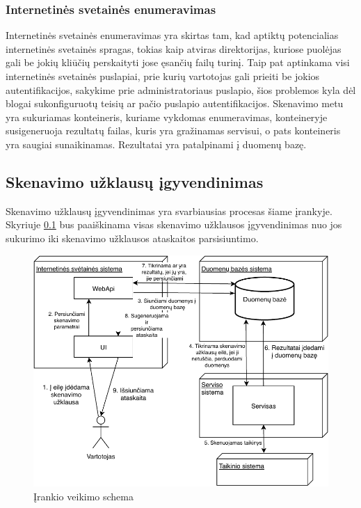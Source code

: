 \documentclass[a4paper,12pt,fleqn]{article}
\begin{document}
\subsubsection{Internetinės svetainės enumeravimas}
\label{sec:scanEnum}
Internetinės svetainės enumeravimas yra skirtas tam, kad aptiktų potencialias internetinės svetainės spragas, tokias kaip atviras direktorijas, kuriose puolėjas gali be jokių kliūčių perskaityti jose ęsančių failų turinį. Taip pat aptinkama visi internetinės svetainės puslapiai, prie kurių vartotojas gali prieiti be jokios autentifikacijos, sakykime prie administratoriaus puslapio, šios problemos kyla dėl blogai sukonfiguruotų teisių ar pačio puslapio autentifikacijos. Skenavimo metu yra sukuriamas konteineris, kuriame vykdomas enumeravimas, konteineryje susigeneruoja rezultatų failas, kuris yra gražinamas servisui, o pats konteineris yra saugiai sunaikinamas. Rezultatai yra patalpinami į duomenų bazę.

\subsection{Skenavimo užklausų įgyvendinimas}
\label{sec:allProc}

Skenavimo užklausų įgyvendinimas yra svarbiausias procesas šiame įrankyje. Skyriuje \ref{sec:allProc} bus paaiškinama visas skenavimo užklausos įgyvendinimas nuo jos sukurimo iki skenavimo užklausos ataskaitos parsisiuntimo.

\begin{figure}[H]
	\centering
	\includegraphics[width=1\textwidth]{figs/Fulllt.pdf}
	\caption{Įrankio veikimo schema}
	\label{fig:full}
\end{figure}
\end{document}
